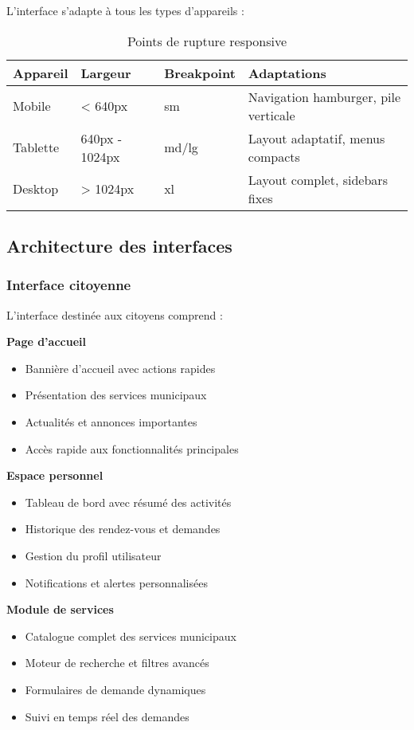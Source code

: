 L'interface s'adapte à tous les types d'appareils :

\begin{table}[H]
\centering
\caption{Points de rupture responsive}
\begin{tabular}{|l|l|l|l|}
\hline
\textbf{Appareil} & \textbf{Largeur} & \textbf{Breakpoint} & \textbf{Adaptations} \\
\hline
Mobile & < 640px & sm & Navigation hamburger, pile verticale \\
Tablette & 640px - 1024px & md/lg & Layout adaptatif, menus compacts \\
Desktop & > 1024px & xl & Layout complet, sidebars fixes \\
\hline
\end{tabular}
\end{table}

\subsection{Architecture des interfaces}

\subsubsection{Interface citoyenne}

L'interface destinée aux citoyens comprend :

\textbf{Page d'accueil}
\begin{itemize}
\item Bannière d'accueil avec actions rapides
\item Présentation des services municipaux
\item Actualités et annonces importantes
\item Accès rapide aux fonctionnalités principales
\end{itemize}

\textbf{Espace personnel}
\begin{itemize}
\item Tableau de bord avec résumé des activités
\item Historique des rendez-vous et demandes
\item Gestion du profil utilisateur
\item Notifications et alertes personnalisées
\end{itemize}

\textbf{Module de services}
\begin{itemize}
\item Catalogue complet des services municipaux
\item Moteur de recherche et filtres avancés
\item Formulaires de demande dynamiques
\item Suivi en temps réel des demandes
\end{itemize}

